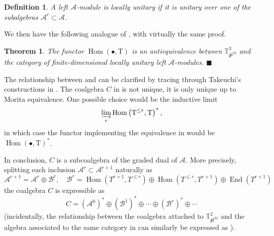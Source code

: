 \documentclass[11pt]{article}
\theoremstyle{plain}
\newtheorem{theorem}[lemma]{Theorem}
\theoremstyle{nonumberplain}
\theoremstyle{plain}
\newtheorem{definition}[lemma]{Definition}
\newtheorem{remark}[lemma]{Remark}
\theoremstyle{nonumberplain}
\newcommand\bT{{\mathbb T}}
\newcommand\cA{{\mathcal A}}
\newcommand\cB{{\mathcal B}}
\newcommand\fgl{\mathfrak{gl}}
\DeclareMathOperator{\End}{\mathrm{End}}
\DeclareMathOperator{\Hom}{\mathrm{Hom}}
\newcommand{\define}[1]{{\em #1}}
\newcommand{\qedhere}{\mbox{}\hfill\ensuremath{\blacksquare}}
\begin{document}

\begin{definition}
  A left $\cA$-module is \define{locally unitary} if it is unitary over one of the subalgebras $\cA^r\subset \cA$. 
\end{definition}


We then have the following analogue of \cite[Corollary 5.2]{DPS}, with virtually the same proof. 


\begin{theorem}\label{th.mof}
  The functor $\Hom(\bullet,\mathrm{T})$ is an antiequivalence between $\bT^3_{\fgl^M}$ and the category of finite-dimensional locally unitary left $\cA$-modules. 
\qedhere
\end{theorem}


The relationship between  and  can be clarified by tracing through Takeuchi's constructions in \cite[$\S$5]{Tak77}. The coalgebra $C$ in  is not unique, it is only unique up to Morita equivalence. One possible choice would be the inductive limit
\begin{equation}\label{eq.C_choice}
  \varinjlim_r \Hom\left(\mathrm{T}^{\le r},\mathrm{T}\right)^*,
\end{equation}
in which case the functor implementing the equivalence in  would be $\Hom(\bullet,\mathrm{T})^*$. 

In conclusion, $C$ is a subcoalgebra of the graded dual of $\cA$. More precisely, splitting each inclusion $\cA^r\subset \cA^{r+1}$ naturally as 
\begin{equation*}
  \cA^{r+1}=\cA^r\oplus \cB^r,\quad \cB^r=\Hom(T^{r+1},T^{\le r})\oplus \Hom(T^{\le r},T^{r+1})\oplus \End(T^{r+1})
\end{equation*}
the coalgebra $C$ is expressible as
\begin{equation}\label{eq:dual}
  C=(\cA^0)^*\oplus (\cB^1)^*\oplus \cdots\oplus (\cB^r)^*\oplus \cdots
\end{equation}
(incidentally, the relationship between the coalgebra attached to $\bT^2_{\fgl^M}$ and the algebra associated to the same category in \cite[$\S$5]{DPS} can similarly be expressed as ). 
\end{document}

